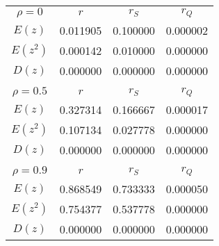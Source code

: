 \begin{table}[H]
    \centering
    \begin{tabular}{c|c|c|c}
        $$\rho=0$$ & $r$ & $r_{S}$ & $r_{Q}$ \\
        $E(z)$ & 0.011905 & 0.100000 & 0.000002 \\
        $E(z^2)$ & 0.000142 & 0.010000 & 0.000000 \\
        $D(z)$ & 0.000000 & 0.000000 & 0.000000 \\
        \hline
        \multicolumn{4}{c}{} \\
        $$\rho=0.5$$ & $r$ & $r_{S}$ & $r_{Q}$ \\
        $E(z)$ & 0.327314 & 0.166667 & 0.000017 \\
        $E(z^2)$ & 0.107134 & 0.027778 & 0.000000 \\
        $D(z)$ & 0.000000 & 0.000000 & 0.000000 \\
        \hline
        \multicolumn{4}{c}{} \\
        $$\rho=0.9$$ & $r$ & $r_{S}$ & $r_{Q}$ \\
        $E(z)$ & 0.868549 & 0.733333 & 0.000050 \\
        $E(z^2)$ & 0.754377 & 0.537778 & 0.000000 \\
        $D(z)$ & 0.000000 & 0.000000 & 0.000000 \\
    \end{tabular}
    \caption{}
    \label{}
\end{table}